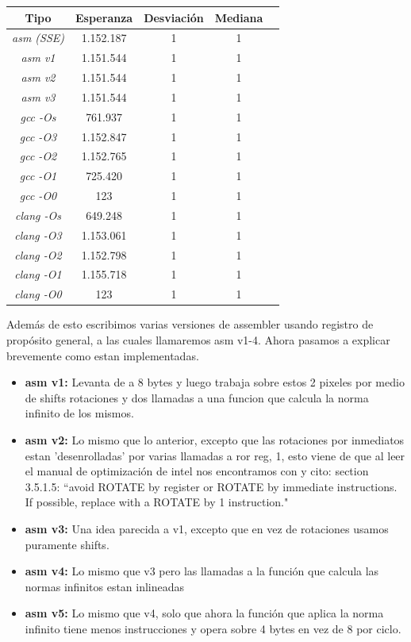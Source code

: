 \documentclass[a4paper]{article}
\begin{document}
\begin{center}
        \begin{tabular}[c]{|c|c|c|c|c|}
    \hline
        \textbf{Tipo} &  \textbf{Esperanza} & \textbf{Desviación} & \textbf{Mediana}\\
        \hline
\textit{asm (SSE)} &   1.152.187  & 1 & 1\\
        \hline
\textit{asm v1} &   1.151.544    & 1 & 1\\
        \hline
\textit{asm v2} &   1.151.544    & 1 & 1 \\
        \hline
\textit{asm v3} &   1.151.544    & 1 & 1\\
        \hline
\textit{gcc -Os} &  761.937   & 1 & 1\\
        \hline
\textit{gcc -O3} &  1.152.847 & 1 & 1\\
        \hline
\textit{gcc -O2} &  1.152.765 & 1 & 1\\
        \hline
\textit{gcc -O1} &  725.420 & 1 & 1\\
        \hline
\textit{gcc -O0} & 123  & 1 & 1\\
        \hline
\textit{clang -Os} &    649.248 & 1 & 1\\
        \hline
\textit{clang -O3} &    1.153.061 & 1 & 1\\
        \hline
\textit{clang -O2} &    1.152.798  & 1 & 1\\
        \hline
\textit{clang -O1} &    1.155.718  & 1 & 1\\
        \hline
\textit{clang -O0} & 123  & 1 & 1 \\
        \hline
    \end{tabular}
\end{center}


Además de esto escribimos varias versiones de assembler usando registro de propósito general, a las cuales llamaremos asm v1-4. Ahora pasamos a explicar brevemente como estan implementadas.

\begin{itemize}[label={}]
\item[] \textbf{asm v1:} Levanta de a 8 bytes y luego trabaja sobre estos 2 pixeles por medio de shifts rotaciones y dos llamadas a una funcion que calcula la norma infinito de los mismos.
\item[] \textbf{asm v2:} Lo mismo que lo anterior, excepto que las rotaciones por inmediatos estan 'desenrolladas' por varias llamadas a ror reg, 1, esto viene de que al leer el manual de optimización de intel nos encontramos con y cito: section 3.5.1.5: ``avoid ROTATE by register or ROTATE by immediate instructions. If possible, replace with a ROTATE by 1 instruction."
\item[] \textbf{asm v3:} Una idea parecida a v1, excepto que en vez de rotaciones usamos puramente shifts.
\item[] \textbf{asm v4:} Lo mismo que v3 pero las llamadas a la función que calcula las normas infinitos estan inlineadas
\item[] \textbf{asm v5:} Lo mismo que v4, solo que ahora la función que aplica la norma infinito tiene menos instrucciones y opera sobre 4 bytes en vez de 8 por ciclo.
\end{itemize}
\end{document}
